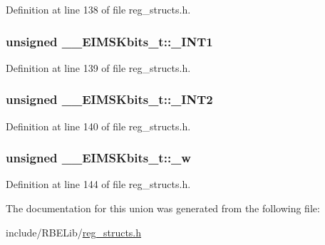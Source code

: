 Definition at line 138 of file reg\+\_\+structs.\+h.

\hypertarget{union_____e_i_m_s_kbits__t_a7d56dd76bfbe8b45720080be775ed7d2}{
\subsubsection[{\+\_\+\+I\+N\+T1}]{\setlength{\rightskip}{0pt plus 5cm}unsigned \+\_\+\+\_\+\+E\+I\+M\+S\+Kbits\+\_\+t\+::\+\_\+\+I\+N\+T1}}\label{union_____e_i_m_s_kbits__t_a7d56dd76bfbe8b45720080be775ed7d2}


Definition at line 139 of file reg\+\_\+structs.\+h.

\hypertarget{union_____e_i_m_s_kbits__t_a7eefb1923e830c81be8bd25862d5e3e8}{
\subsubsection[{\+\_\+\+I\+N\+T2}]{\setlength{\rightskip}{0pt plus 5cm}unsigned \+\_\+\+\_\+\+E\+I\+M\+S\+Kbits\+\_\+t\+::\+\_\+\+I\+N\+T2}}\label{union_____e_i_m_s_kbits__t_a7eefb1923e830c81be8bd25862d5e3e8}


Definition at line 140 of file reg\+\_\+structs.\+h.

\hypertarget{union_____e_i_m_s_kbits__t_ac46f91ef3ab7606b6009bf3f2f54d325}{
\subsubsection[{\+\_\+w}]{\setlength{\rightskip}{0pt plus 5cm}unsigned \+\_\+\+\_\+\+E\+I\+M\+S\+Kbits\+\_\+t\+::\+\_\+w}}\label{union_____e_i_m_s_kbits__t_ac46f91ef3ab7606b6009bf3f2f54d325}


Definition at line 144 of file reg\+\_\+structs.\+h.



The documentation for this union was generated from the following file\+:\begin{DoxyCompactItemize}
\item 
include/\+R\+B\+E\+Lib/\hyperlink{reg__structs_8h}{reg\+\_\+structs.\+h}\end{DoxyCompactItemize}
